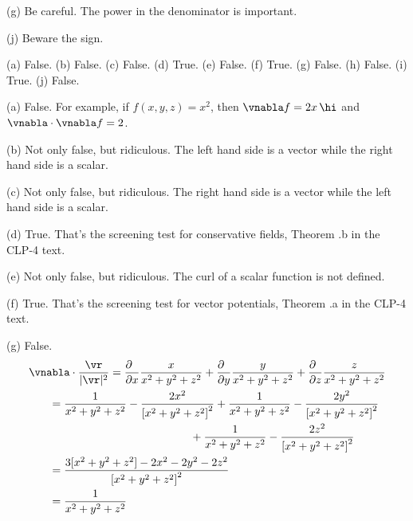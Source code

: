 \begin{hint} 
(g) Be careful. The power in the denominator is important.

(j) Beware the sign.
\end{hint}

\begin{answer} 
(a) False.\qquad
(b) False.\qquad
(c) False.\qquad
(d) True.\qquad
(e) False.\qquad
(f) True.\qquad
(g) False.\qquad
(h) False.\qquad
(i) True.\qquad
(j) False.
\end{answer}

\begin{solution}
(a) False. For example, if $f(x,y,z)=x^2$, then $\vnabla f = 2x\,\hi$
and $\vnabla\cdot\vnabla f = 2$.

(b) Not only false, but ridiculous. The left hand side is a vector while
the right hand side is a scalar.

(c) Not only false, but ridiculous. The right hand side is a vector while
the left hand side is a scalar.

(d) True. That's the screening test for conservative fields,
Theorem .b in the CLP-4 text.

(e) Not only false, but ridiculous. The curl of a scalar function
is not defined.

(f) True. That's the screening test for vector potentials,
Theorem .a in the CLP-4 text.

(g) False.
\begin{align*}
&\vnabla\cdot\frac{\vr}{|\vr|^2} 
=\frac{\partial\hfill}{\partial x}\frac{x}{x^2+y^2+z^2}
+\frac{\partial\hfill}{\partial y}\frac{y}{x^2+y^2+z^2} 
+\frac{\partial\hfill}{\partial z}\frac{z}{x^2+y^2+z^2}
\\
&\hskip0.25in
=\frac{1}{x^2+y^2+z^2} - \frac{2x^2}{{[x^2+y^2+z^2]}^2}
+\frac{1}{x^2+y^2+z^2} - \frac{2y^2}{{[x^2+y^2+z^2]}^2}
    \\&\hskip2in
+\frac{1}{x^2+y^2+z^2} - \frac{2z^2}{{[x^2+y^2+z^2]}^2}
\\
&\hskip0.25in
=\frac{3[x^2+y^2+z^2] - 2x^2-2y^2-2z^2}{{[x^2+y^2+z^2]}^2}
\\
&\hskip0.25in
=\frac{1}{x^2+y^2+z^2}
\end{align*}


\end{solution}

